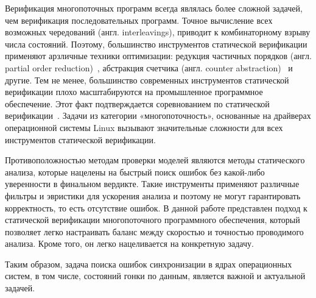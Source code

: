 Верификация многопоточных программ всегда являлась более сложной задачей, чем верификация последовательных программ.
Точное вычисление всех возможных чередований (англ. interleavings), приводит к комбинаторному взрыву числа состояний.
Поэтому, большинство инструментов статической верификации применяют арзличные техники оптимизации: редукция частичных порядков (англ. partial order reduction)~\cite{Abdulla:2014,Godefroid:1996}, абстракция счетчика (англ. counter abstraction)~\cite{Basler:2009} и другие.
Тем не менее, большинство современных инструментов статической верификации плохо масштабируются на промышленное программное обеспечение.
Этот факт подтверждается соревнованием по статической верификации~\cite{svcomp19}.
Задачи из категории «многопоточность», основанные на драйверах операционной системы Linux вызывают значительные сложности для всех инструментов статической верификации.

Противоположностью методам проверки моделей являются методы статического анализа, которые нацелены на быстрый поиск ошибок без какой-либо уверенности в финальном вердикте.
Такие инструменты применяют различные фильтры и эвристики для ускорения анализа и поэтому не могут гарантировать корректность, то есть отсутствие ошибок.
В данной работе представлен подход к статической верификации многопоточного программного обеспечения, который позволяет легко настраивать баланс между скоростью и точностью проводимого анализа. Кроме того, он легко нацеливается на конкретную задачу.


Таким образом, задача поиска ошибок синхронизации в ядрах операционных систем, в том числе, состояний гонки по данным, является важной и актуальной задачей.

\ifsynopsis
\else


